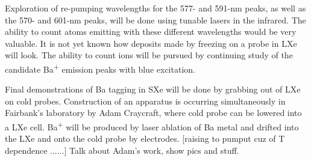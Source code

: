 Exploration of re-pumping wavelengths for the 577- and 591-nm peaks, as well as the 570- and 601-nm peaks, will be done using tunable lasers in the infrared.  The ability to count atoms emitting with these different wavelengths would be very valuable.  It is not yet known how deposits made by freezing on a probe in LXe will look.  The ability to count ions will be pursued by continuing study of the candidate Ba\textsuperscript{+} emission peaks with blue excitation.

Final demonstrations of Ba tagging in SXe will be done by grabbing out of LXe on cold probes.  Construction of an apparatus is occurring simultaneously in Fairbank's laboratory by Adam Craycraft, where cold probe can be lowered into a LXe cell.  Ba\textsuperscript{+} will be produced by laser ablation of Ba metal and drifted into the LXe and onto the cold probe by electrodes.  [raising to pumput cuz of T dependence ......]
Talk about Adam's work, show pics and stuff.